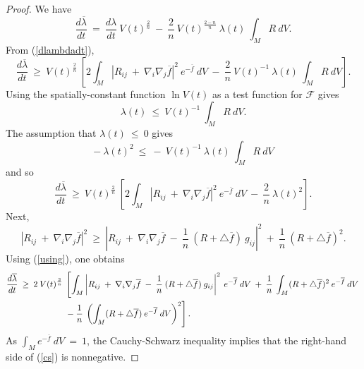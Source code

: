 \documentclass[12pt]{amsart}
\numberwithin{equation}{section}
\theoremstyle{plain}
\theoremstyle{definition}
\theoremstyle{remark}
\begin{document}
\begin{proof}
We have
\begin{equation}
\frac{d\overline{\lambda}}{dt} \: = \:
\frac{d\lambda}{dt} \: V(t)^{\frac{2}{n}} \: - \:
\frac{2}{n} \: V(t)^{\frac{2-n}{n}} \: \lambda(t) \: \int_M R \: dV.
\end{equation}
From (\ref{dlambdadt}),
\begin{equation}
\frac{d\overline{\lambda}}{dt} \: \ge \:
V(t)^{\frac{2}{n}} \: \left[
2 \int_M |R_{ij} \: + \:
\nabla_i \nabla_j \overline{f}|^2 \: e^{- \overline{f}} \:  dV 
 \: - \:
\frac{2}{n} \: V(t)^{-1} \: \lambda(t) \: \int_M R \: dV \right].
\end{equation}
Using the spatially-constant function $\ln V(t)$ as a test function for ${\mathcal F}$
gives
\begin{equation} \label{ttest}
\lambda(t) \: \le \: V(t)^{-1} \: \int_M R \: dV.
\end{equation}
The assumption that $\lambda(t) \: \le \: 0$ gives
\begin{equation}
- \: \lambda(t)^2 \: \le \: - \: V(t)^{-1} \: \lambda(t) \: \int_M R \: dV
\end{equation}
and so
\begin{equation}
\frac{d\overline{\lambda}}{dt} \: \ge \:
V(t)^{\frac{2}{n}} \: \left[
2 \int_M |R_{ij} \: + \:
\nabla_i \nabla_j \overline{f}|^2 \: e^{- \overline{f}} \: dV 
 \: - \:
\frac{2}{n} \: \lambda(t)^2 \right].
\end{equation}
Next,
\begin{equation}
|R_{ij} \: + \:
\nabla_i \nabla_j \overline{f}|^2 \: \ge \:
\left| R_{ij} \: + \:
\nabla_i \nabla_j \overline{f} \: - \: \frac{1}{n} \: (R + \triangle \overline{f}) \: g_{ij}
\right|^2 \: + \: \frac{1}{n} \: (R + \triangle \overline{f})^2.  
\end{equation}
Using (\ref{using}), one obtains
\begin{align} \label{cs}
\frac{d\overline{\lambda}}{dt} \: \ge \: 2 \:
V(t)^{\frac{2}{n}} \: & \left[
\int_M \left| R_{ij} \: + \:
\nabla_i \nabla_j \overline{f} \: - \: \frac{1}{n} \: (R + \triangle \overline{f}) \: 
g_{ij} \right|^2 \: e^{- \overline{f}} \: dV
\: + \: \frac{1}{n} \: \int_M (R + \triangle \overline{f})^2 \: e^{- \overline{f}} \: dV \right. \\
& \left. - \: \frac{1}{n} \: \left( \int_M (R + \triangle \overline{f}) \: e^{- \overline{f}} \: dV
\right)^2 \right]. \notag
\end{align}
As $\int_M e^{- \overline{f}} \: dV \: = \: 1$, the Cauchy-Schwarz inequality implies
that the right-hand side of (\ref{cs}) is nonnegative.
\end{proof}
\end{document}
